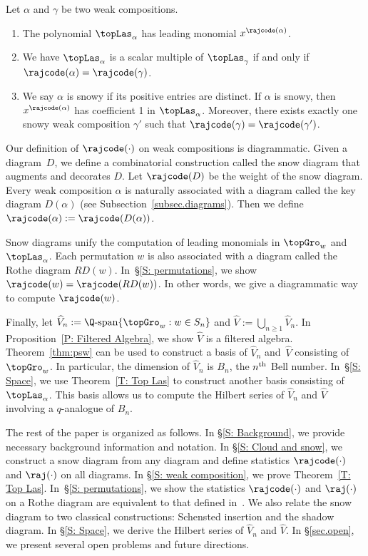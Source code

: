 \begin{ourthm}
\label{T: Top Las}
Let $\alpha$ and $\gamma$ be two weak compositions. 
\begin{enumerate}
\item[(a)]
The polynomial $\topLas_\alpha$ has leading monomial $x^{\rajcode(\alpha)}$.
\item[(b)] We have
$\topLas_\alpha$ is a scalar multiple of $\topLas_{\gamma}$
if and only if $\rajcode(\alpha) = \rajcode(\gamma)$.
\item[(c)] 
We say $\alpha$ is snowy if its
positive entries are distinct.
If $\alpha$ is snowy, then $x^{\rajcode(\alpha)}$ has coefficient 1 in $\topLas_\alpha$.
Moreover, 
there exists exactly one snowy weak composition $\gamma'$ 
such that $\rajcode(\gamma) = \rajcode(\gamma')$.
\end{enumerate}     
\end{ourthm}

Our definition of $\rajcode(\cdot)$
on weak compositions is diagrammatic. 
Given a diagram~$D$, 
we define a combinatorial
construction called the snow diagram 
that augments and decorates $D$.
Let $\rajcode(D)$
be the weight of the snow diagram.
Every weak composition $\alpha$ is naturally
associated with a diagram called
the key diagram $D(\alpha)$
(see Subsection~\ref{subsec.diagrams}).
Then we define $\rajcode(\alpha):=\rajcode(D(\alpha))$.

Snow diagrams unify the computation of leading monomials in $\topGro_w$ and $\topLas_\alpha$.
Each permutation $w$ is also associated
with a diagram called the Rothe diagram
$RD(w)$.
In~\S\ref{S: permutations},
we show $\rajcode(w) = \rajcode(RD(w))$.
In other words, we give a diagrammatic way to compute $\rajcode(w)$.

Finally, let $\widehat{V}_n :=  \Q\textrm{-span}\{\topGro_w: w \in S_n\}$ and $\widehat{V} :=  
\bigcup_{n \geq 1} \widehat{V}_n$.
In Proposition~\ref{P: Filtered Algebra},
we show $\widehat{V}$
is a filtered algebra. 
Theorem~\ref{thm:psw} can be used to construct a basis of $\widehat{V}_n$
and~$\widehat{V}$ 
consisting of $\topGro_w$.
In particular, 
the dimension of $\widehat{V}_n$
is $B_n$, the $n\textsuperscript{th}$ Bell number.
In~\S\ref{S: Space},
we use Theorem~\ref{T: Top Las} to construct another basis consisting of $\topLas_\alpha$.
This basis allows us to compute the Hilbert series of $\widehat{V}_n$ 
and $\widehat{V}$
involving a $q$-analogue of $B_n$.

The rest of the paper is organized as follows. 
In \S\ref{S: Background}, we provide necessary background information and notation.
In \S\ref{S: Cloud and snow}, we construct a snow diagram from any diagram 
and define statistics $\rajcode(\cdot)$ and $ \raj(\cdot)$ on all diagrams.
In \S\ref{S: weak composition}, we  prove Theorem~\ref{T: Top Las}.
In~\S\ref{S: permutations}, we show the statistics $\rajcode(\cdot)$ and $\raj(\cdot)$ 
on a Rothe diagram are equivalent to that defined in~\cite{PSW}.
We also relate the snow diagram to two classical constructions: 
Schensted insertion and the shadow diagram.
In \S\ref{S: Space}, we derive the Hilbert series 
of $\widehat{V}_n$ and $\widehat{V}$.
In \S\ref{sec.open}, we present several open problems and future directions.

